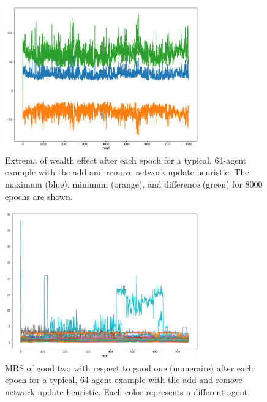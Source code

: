\documentclass[smallextended]{svjour3}
\begin{document}
\begin{figure}
  \includegraphics[width=0.75\textwidth]{h2allgap.png}
  \caption{Extrema of wealth effect after each epoch for a typical, 64-agent
    example with the add-and-remove network update heuristic. The maximum (blue),
    minimum (orange), and difference (green) for 8000 epochs are shown.}
  \label{h2allgap}
\end{figure}

\begin{figure}
  \includegraphics[width=0.75\textwidth]{h2prices.png}
  \caption{MRS of good two with respect to good one (numeraire) after each epoch
    for a typical, 64-agent example with the add-and-remove network update heuristic.
    Each color represents a different agent.}
  \label{h2prices}
\end{figure}
\end{document}
